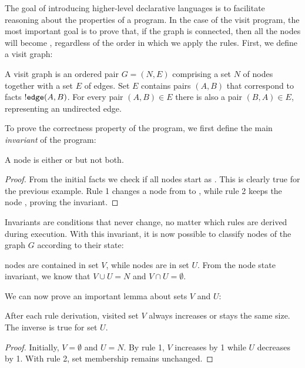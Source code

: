 The goal of introducing higher-level declarative languages is to facilitate
reasoning about the properties of a program. In the case of the visit program,
the most important goal is to prove that, if the graph is connected, then all
the nodes will become , regardless of the order in which we apply
the rules. First, we define a visit graph:

\begin{definition}
A visit graph is an ordered pair $G = (N, E)$ comprising a set $N$ of nodes together
with a set $E$ of edges. Set $E$ contains pairs $(A, B)$ that correspond to
facts ${!} \mathtt{edge}(A, B)$. For every pair $(A, B) \in E$ there is also a
pair $(B, A) \in E$, representing an undirected edge.
\end{definition}

To prove the correctness property of the program, we first define the main
\emph{invariant} of the program:

\begin{invariant}
A node is either  or  but not both.
\end{invariant}

\begin{proof}

From the initial facts we check if all nodes start as . This is
clearly true for the previous example. Rule 1 changes a node from
 to , while rule 2 keeps the node ,
proving the invariant.

\end{proof}

Invariants are conditions that never change, no matter which rules are derived
during execution. With this invariant, it is now possible to classify nodes of
the graph $G$ according to their state:

\begin{definition}  nodes are contained in set $V$,
while  nodes are in set $U$. From the node state invariant, we
know that $V \cup U = N$ and $V \cap U = \emptyset$.
\end{definition}

We can now prove an important lemma about sets $V$ and $U$:

\begin{invariant}

After each rule derivation, visited set $V$ always increases or stays the same
size. The inverse is true for set $U$.

\end{invariant}
\begin{proof}
Initially, $V = \emptyset$ and $U = N$.
By rule 1, $V$ increases by 1 while $U$ decreases by 1. With rule 2, set
membership remains unchanged.
\end{proof}

